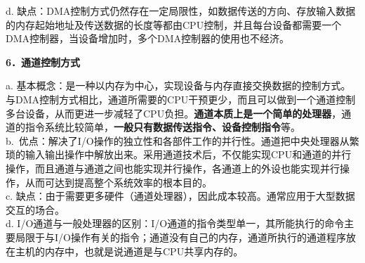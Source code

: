 d.
缺点：DMA控制方式仍然存在一定局限性，如数据传送的方向、存放输入数据的内存起始地址及传送数据的长度等都由CPU控制，并且每台设备都需要一个DMA控制器，当设备增加时，多个DMA控制器的使用也不经济。

\textbf{{6．通道控制方式}}

a.
基本概念：是一种以内存为中心，实现设备与内存直接交换数据的控制方式。与DMA控制方式相比，通道所需要的CPU干预更少，而且可以做到一个通道控制多台设备，从而更进一步减轻了CPU负担。\textbf{通道本质上是一个简单的处理器}，通道的指令系统比较简单，\textbf{一般只有数据传送指令、设备控制指令}等。\\
b.~优点：{解决了I/O操作的独立性和各部件工作的并行性。通道把中央处理器从繁琐的输入输出操作中解放出来。采用通道技术后，不仅能实现CPU和通道的并行操作，而且通道与通道之间也能实现并行操作，各通道上的外设也能实现并行操作，从而可达到提高整个系统效率的根本目的。\\
c.
缺点：由于需要更多硬件（通道处理器），因此成本较高。通常应用于大型数据交互的场合。\\
d.
I/O通道与一般处理器的区别：I/O通道的指令类型单一，其所能执行的命令主要局限于与I/O操作有关的指令；通道没有自己的内存，通道所执行的通道程序放在主机的内存中，也就是说通道是与CPU共享内存的。}
